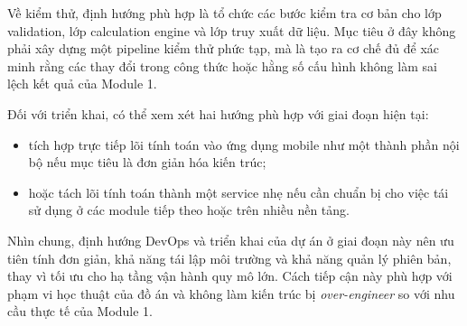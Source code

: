 \documentclass[a4paper]{article}
\begin{document}
Về kiểm thử, định hướng phù hợp là tổ chức các bước kiểm tra cơ bản cho lớp validation, lớp calculation engine và lớp truy xuất dữ liệu. Mục tiêu ở đây không phải xây dựng một pipeline kiểm thử phức tạp, mà là tạo ra cơ chế đủ để xác minh rằng các thay đổi trong công thức hoặc hằng số cấu hình không làm sai lệch kết quả của Module 1.

Đối với triển khai, có thể xem xét hai hướng phù hợp với giai đoạn hiện tại:

\begin{itemize}
\item tích hợp trực tiếp lõi tính toán vào ứng dụng mobile như một thành phần nội bộ nếu mục tiêu là đơn giản hóa kiến trúc;
\item hoặc tách lõi tính toán thành một service nhẹ nếu cần chuẩn bị cho việc tái sử dụng ở các module tiếp theo hoặc trên nhiều nền tảng.
\end{itemize}

Nhìn chung, định hướng DevOps và triển khai của dự án ở giai đoạn này nên ưu tiên tính đơn giản, khả năng tái lập môi trường và khả năng quản lý phiên bản, thay vì tối ưu cho hạ tầng vận hành quy mô lớn. Cách tiếp cận này phù hợp với phạm vi học thuật của đồ án và không làm kiến trúc bị \textit{over-engineer} so với nhu cầu thực tế của Module 1.
\end{document}
